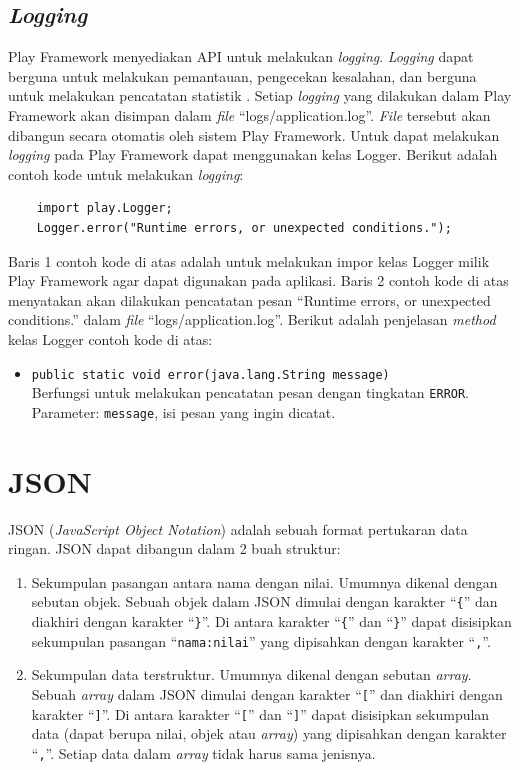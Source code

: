 \subsection{\textit{Logging}}
\label{sec:logger}
Play Framework menyediakan API untuk melakukan \textit{logging}. \textit{Logging} dapat berguna untuk melakukan pemantauan, pengecekan kesalahan, dan berguna untuk melakukan pencatatan statistik \cite{playframeworkweb}. Setiap \textit{logging} yang dilakukan dalam Play Framework akan disimpan dalam \textit{file} ``logs/application.log''. \textit{File} tersebut akan dibangun secara otomatis oleh sistem Play Framework. Untuk dapat melakukan \textit{logging} pada Play Framework dapat menggunakan kelas Logger. Berikut adalah contoh kode untuk melakukan \textit{logging}:
\begin{lstlisting}
	import play.Logger;
	Logger.error("Runtime errors, or unexpected conditions.");
\end{lstlisting}

Baris 1 contoh kode di atas adalah untuk melakukan impor kelas Logger milik Play Framework agar dapat digunakan pada aplikasi. Baris 2 contoh kode di atas menyatakan akan dilakukan pencatatan pesan ``Runtime errors, or unexpected conditions.'' dalam \textit{file} ``logs/application.log''. Berikut adalah penjelasan \textit{method} kelas Logger contoh kode di atas:
\begin{itemize}
	\item \texttt{public static void error(java.lang.String message)}\\
	Berfungsi untuk melakukan pencatatan pesan dengan tingkatan \texttt{ERROR}.\\
	Parameter: \texttt{message}, isi pesan yang ingin dicatat.
\end{itemize}



\section{JSON}
\label{sec:json}
JSON (\textit{JavaScript Object Notation}) adalah sebuah format pertukaran data ringan\cite{json}. JSON dapat dibangun dalam 2 buah struktur:
\begin{enumerate}
	\item Sekumpulan pasangan antara nama dengan nilai. Umumnya dikenal dengan sebutan objek. Sebuah objek dalam JSON dimulai dengan karakter ``\texttt{\{}'' dan diakhiri dengan karakter ``\texttt{\}}''. Di antara karakter ``\texttt{\{}'' dan ``\texttt{\}}'' dapat disisipkan sekumpulan pasangan ``\texttt{nama:nilai}'' yang dipisahkan dengan karakter ``\texttt{,}''.
	\item Sekumpulan data terstruktur. Umumnya dikenal dengan sebutan \textit{array}. Sebuah \textit{array} dalam JSON dimulai dengan karakter ``\texttt{[}'' dan diakhiri dengan karakter ``\texttt{]}''. Di antara karakter ``\texttt{[}'' dan ``\texttt{]}'' dapat disisipkan sekumpulan data (dapat berupa nilai, objek atau \textit{array}) yang dipisahkan dengan karakter ``\texttt{,}''. Setiap data dalam \textit{array} tidak harus sama jenisnya.
\end{enumerate}

